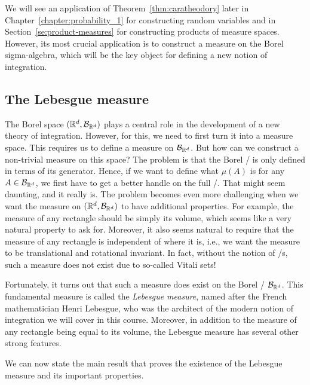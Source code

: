 We will see an application of Theorem~\ref{thm:caratheodory} later in Chapter~\ref{chapter:probability_1} for constructing random variables and in Section~\ref{se:product-measures} for constructing products of measure spaces. However, its most crucial application is to construct a measure on the Borel sigma-algebra, which will be the key object for defining a new notion of integration.


\subsection{The Lebesgue measure}

The Borel space $(\mathbb R^d, \mathcal B_{\mathbb R^d})$ plays a central role in the development of a new theory of integration. However, for this, we need to first turn it into a measure space. This requires us to define a measure on $\mathcal B_{\mathbb R^d}$. But how can we construct a non-trivial measure on this space? The problem is that the Borel \sigalg/ is only defined in terms of its generator. Hence, if we want to define what $\mu(A)$ is for any $A \in \mathcal B_{\mathbb R^d}$, we first have to get a better handle on the full \sigalg/. That might seem daunting, and it really is. The problem becomes even more challenging when we want the measure on $(\mathbb R^d, \mathcal B_{\mathbb R^d})$ to have additional properties. For example, the measure of any rectangle should be simply its volume, which seems like a very natural property to ask for. Moreover, it also seems natural to require that the measure of any rectangle is independent of where it is, i.e., we want the measure to be translational and rotational invariant. In fact, without the notion of \sigalg/s, such a measure does not exist due to so-called Vitali sets!  

Fortunately, it turns out that such a measure does exist on the Borel \sigalg/ $\mathcal B_{\mathbb R^d}$. This fundamental measure is called the \emph{Lebesgue measure}, named after the French mathematician Henri Lebesgue, who was the architect of the modern notion of integration we will cover in this course. Moreover, in addition to the measure of any rectangle being equal to its volume, the Lebesgue measure has several other strong features. 


We can now state the main result that proves the existence of the Lebesgue measure and its important properties. 

